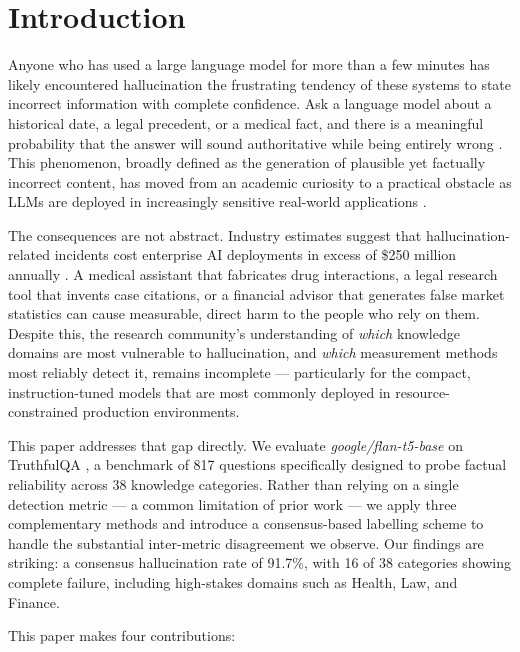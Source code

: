 \documentclass[conference]{IEEEtran}
\begin{document}
\section{Introduction}
\label{sec:introduction}

Anyone who has used a large language model for more than a
few minutes has likely encountered hallucination the
frustrating tendency of these systems to state incorrect
information with complete confidence.
Ask a language model about a historical date, a legal
precedent, or a medical fact, and there is a meaningful
probability that the answer will sound authoritative while
being entirely wrong \cite{ji2023survey}.
This phenomenon, broadly defined as the generation of
plausible yet factually incorrect content, has moved from
an academic curiosity to a practical obstacle as LLMs are
deployed in increasingly sensitive real-world applications
\cite{huang2023survey}.

The consequences are not abstract.
Industry estimates suggest that hallucination-related
incidents cost enterprise AI deployments in excess of
\$250 million annually \cite{guardrails2024}.
A medical assistant that fabricates drug interactions, a
legal research tool that invents case citations, or a
financial advisor that generates false market statistics
can cause measurable, direct harm to the people who
rely on them.
Despite this, the research community's understanding of
\textit{which} knowledge domains are most vulnerable to
hallucination, and \textit{which} measurement methods
most reliably detect it, remains incomplete — particularly
for the compact, instruction-tuned models that are most
commonly deployed in resource-constrained production
environments.

This paper addresses that gap directly.
We evaluate \textit{google/flan-t5-base} on TruthfulQA
\cite{lin2022truthfulqa}, a benchmark of 817 questions
specifically designed to probe factual reliability across
38 knowledge categories.
Rather than relying on a single detection metric — a
common limitation of prior work — we apply three
complementary methods and introduce a consensus-based
labelling scheme to handle the substantial inter-metric
disagreement we observe.
Our findings are striking: a consensus hallucination rate
of 91.7\%, with 16 of 38 categories showing complete
failure, including high-stakes domains such as Health,
Law, and Finance.

This paper makes four contributions:
\end{document}

